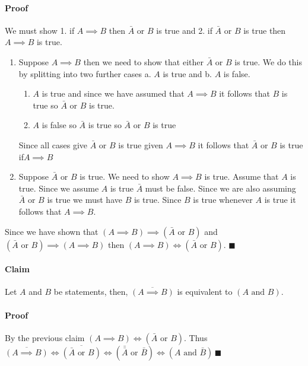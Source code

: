 \documentclass{article}
\begin{document}
\paragraph{Proof} We must show 1. if \(A\implies B\) then \(\bar A \text{ or } B\) is true and 2. if \(\bar A \text{ or } B\) is true then \(A\implies B\) is true.

\begin{enumerate}
\item Suppose \(A\implies B\) then we need to show that either \(\bar A\) or \(B\) is true. We do this by splitting into two further cases a. \(A\) is true and b. \(A\) is false.
\begin{enumerate}
\item \(A\) is true and since we have assumed that \(A\implies B\) it follows that \(B\) is true so \(\bar A\text{ or }B\) is true.
\item \(A\) is false so \(\bar A\) is true so \(\bar A\text{ or }B\) is true
\end{enumerate}
Since all cases give \(\bar A\text{ or }B\) is true given \(A\implies B\) it follows that \(\bar A\text{ or }B\) is true if\(A\implies B\)
\item Suppose \(\bar A\text{ or }B\) is true. We need to show \(A\implies B\) is true. Assume that \(A\) is true. Since we assume \(A\) is true \(\bar A\) must be false. Since we are also assuming \(\bar A\text{ or }B\) is true we must have \(B\) is true. Since \(B\) is true whenever \(A\) is true it follows that \(A\implies B.\)
\end{enumerate}
Since we have shown that \((A\implies B)\implies(\bar A \text{ or }B)\) and \((\bar A \text{ or }B)\implies(A\implies B)\) then \((A\implies B)\iff(\bar A \text{ or } B)\). \(\blacksquare\)

\paragraph{Claim} Let \(A\) and \(B\) be statements, then, \(\overline{(A\implies B)}\) is equivalent to \((A \text{ and } B)\).

\paragraph{Proof} By the previous claim \((A\implies B)\iff(\bar A \text{ or } B)\). Thus \(\overline{(A\implies B)}\iff\overline{(\bar A\text{ or }B)}\iff(\bar{\bar{A}}\text{ or } \bar B)\iff(A \text{ and } \bar B)\,\blacksquare\)
\end{document}

